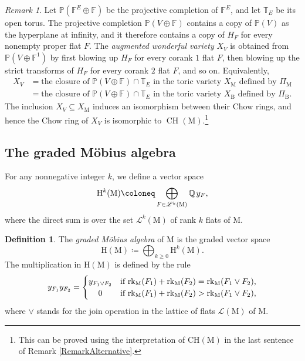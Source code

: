 \documentclass[11pt,reqno]{amsart}
\theoremstyle{definition}
\newtheorem{definition}[theorem]{Definition}
\theoremstyle{remark}
\newtheorem{remark}[theorem]{Remark}
\renewcommand{\(}{\left(}
\renewcommand{\)}{\right)}
\newcommand{\<}{\left<}
\renewcommand{\>}{\right>}
\newcommand{\CH}{\operatorname{CH}}
\begin{document}
\begin{remark}
Let $\mathbb{P}(\mathbb{F}^E \oplus\mathbb{F})$ be the projective completion of $\mathbb{F}^E$,
and let $\mathbb{T}_E$ be its  open torus. %
The projective completion  $\mathbb{P}(V \oplus\mathbb{F})$  contains
a copy of $\mathbb{P}(V)$
as the hyperplane at infinity, and it therefore contains a copy of $H_F$ for every nonempty proper flat $F$.
The \emph{augmented wonderful variety} $X_V$ is obtained from
$\mathbb{P}(V\oplus\mathbb{F}^1)$
by first blowing up $H_F$ for every corank $1$ flat $F$, 
then blowing up the strict transforms of $H_F$ for every corank $2$ flat $F$, and so on.
Equivalently,
\begin{align*}
X_V&=\text{the closure of $\mathbb{P}(V \oplus \mathbb{F}) \cap \mathbb{T}_E$ in the toric variety $X_\mathrm{M}$ defined by $\Pi_\mathrm{M}$}\\
&=\text{the closure of $\mathbb{P}(V \oplus \mathbb{F}) \cap \mathbb{T}_E$ in the toric variety $X_\mathrm{B}$ defined by $\Pi_\mathrm{B}$}.
\end{align*}
The inclusion $X_V \subseteq X_\mathrm{M}$ induces an isomorphism between their Chow rings, 
and hence the Chow ring of $X_V$ is isomorphic to $\CH(\mathrm{M})$.\footnote{This can be proved using the interpretation of $\mathrm{CH}(\mathrm{M})$ in 
the last sentence of Remark \ref{RemarkAlternative}.}
\end{remark}




\subsection{The graded M\"obius algebra}\label{sec:mobius}

For any nonnegative integer $k$, we define a vector space
\[
\mathrm{H}^k(\mathrm{M})\coloneq \bigoplus_{F\in \mathscr{L}^k(\mathrm{M})} \mathbb{Q} \hspace{0.5mm} y_F,
\]
where the direct sum is over the set $\mathscr{L}^k(\mathrm{M})$ of rank $k$ flats of $\mathrm{M}$.

\begin{definition}\label{DefinitionMobiusAlgebra}
The \emph{graded M\"obius algebra} of $\mathrm{M}$
is the graded vector space
\[
\mathrm{H}(\mathrm{M} )\coloneq \bigoplus_{k \ge 0} \mathrm{H}^k(\mathrm{M}).
\]
The multiplication in $\mathrm{H}(\mathrm{M})$ is defined by the rule
\[
y_{F_1}y_{F_2}=\begin{cases} y_{F_1 \lor F_2}& \text{if $\text{rk}_\mathrm{M}(F_1)+\text{rk}_\mathrm{M}(F_2) = \text{rk}_\mathrm{M}(F_1 \lor F_2)$,} \\
\hfil 0 & \text{if $\text{rk}_\mathrm{M}(F_1)+\text{rk}_\mathrm{M}(F_2) > \text{rk}_\mathrm{M}(F_1 \lor F_2)$,} \end{cases}
\]
where $\lor$ stands for the join operation in the lattice of flats $\mathscr{L}(\mathrm{M})$ of $\mathrm{M}$.
\end{definition}
\end{document}
